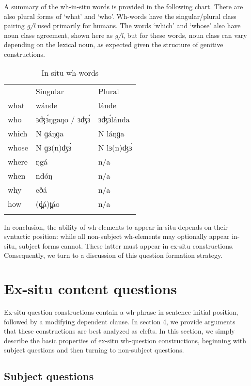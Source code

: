 A summary of the wh-in-situ words is provided in the following chart. There are also plural forms of ‘what’ and ‘who’. Wh-words have the singular/plural class pairing \textit{g/l} used primarily for humans. The words ‘which’ and ‘whose’ also have noun class agreement, shown here as \textit{g/l}, but for these words, noun class can vary depending on the lexical noun, as expected given the structure of genitive constructions. 

\begin{table}
\caption{In-situ wh-words}
\label{Ch19:1}
	\begin{tabular}[t]{lll}
\lsptoprule
& Singular	&	Plural\\
what	&	wánde	&	lánde\\
who	&	ɜʤɜ́ŋgaŋo / ɜʤɜ́	&	ɜʤɜ́lánda\\
which	&	N  ɡáŋɡa	&	N láŋɡa\\
whose	&	N  ɡɜ(n)ʤɜ́	&	N lɜ(n)ʤɜ́\\
where	&	ŋgá	&	n/a\\
when	&	ndóŋ	&	n/a\\
why	&	eðá	&	n/a\\
how	&	(d̪á)t̪áo	&	n/a\\
\lspbottomrule
	\end{tabular}
\end{table}

In conclusion, the ability of wh-elements to appear in-situ depends on their syntactic position: while all non-subject wh-elements may optionally appear in-situ, subject forms cannot. These latter must appear in ex-situ constructions. Consequently, we turn to a discussion of this question formation strategy.


\section{Ex-situ content questions}

Ex-situ question constructions contain a wh-phrase in sentence initial position, followed by a modifying dependent clause. In section 4, we provide arguments that these constructions are best analyzed as clefts. In this section, we simply describe the basic properties of ex-situ wh-question constructions, beginning with subject questions and then turning to non-subject questions. 

\subsection{Subject questions}

